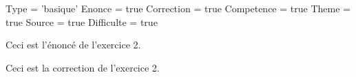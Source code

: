\documentclass{classe-tex3R}
\begin{document}
\begin{luacode}
  Type = 'basique'
  Enonce = true
  Correction = true
  Competence = true
  Theme = true
  Source = true
  Difficulte = true
\end{luacode}
\parametrage



\begin{enonce}
  Ceci est l'énoncé de l'exercice 2.
\end{enonce}

\begin{correction}
  Ceci est la correction de l'exercice 2.
\end{correction}
\end{document}
